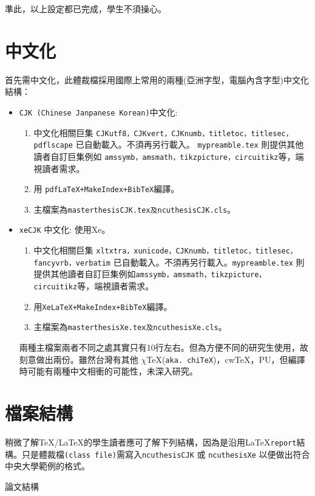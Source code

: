準此，以上設定都已完成，學生不須操心。
\section{中文化}
首先需中文化，此體裁檔採用國際上常用的兩種(亞洲字型，電腦內含字型)中文化結構：
\begin{itemize}
\item {\tt CJK (Chinese Janpanese Korean)}中文化: 
\begin{enumerate}
\item 中文化相關巨集 {\tt CJKutf8，CJKvert，CJKnumb，titletoc，titlesec，pdflscape} 已自動載入。不須再另行載入。
{\tt mypreamble.tex} 則提供其他讀者自訂巨集例如 {\tt amssymb，amsmath，tikzpicture，circuitikz}等，端視讀者需求。
\item 用 {\tt pdfLaTeX+MakeIndex+BibTeX}編譯。
\item 主檔案為{\tt masterthesis{\color{red}CJK}.tex及ncuthesis{\color{red}CJK}.cls}。
\end{enumerate}
\item {\tt xeCJK} 中文化: 使用Xe。
\begin{enumerate}
\item 中文化相關巨集 {\tt xltxtra，xunicode，CJKnumb，titletoc，titlesec，fancyvrb，verbatim} 已自動載入。不須再另行載入。{\tt mypreamble.tex} 則提供其他讀者自訂巨集例如{\tt amssymb，amsmath，tikzpicture， circuitikz}等，端視讀者需求。
\item 用{\tt XeLaTeX+MakeIndex+BibTeX}編譯。
\item 主檔案為{\tt masterthesis{\color{red}Xe}.tex及ncuthesis{\color{red}Xe}.cls}。
\end{enumerate}
兩種主檔案兩者不同之處其實只有10行左右。但為方便不同的研究生使用，故刻意做出兩份。雖然台灣有其他 $\chi$\TeX({\tt aka. chi\TeX})，cw\TeX，PU，但編譯時可能有兩種中文相衝的可能性，未深入研究。
\end{itemize}
\section{檔案結構}
稍微了解\TeX{}/\LaTeX{}的學生讀者應可了解下列結構，因為是沿用\LaTeX{}{\tt report}結構。只是體裁檔{\tt (class file)}需寫入{\tt ncuthesisCJK} 或 {\tt ncuthesisXe} 以便做出符合中央大學範例的格式。%
\begin{table}[hbt!]
\caption{論文結構}
\label{bookstruc} 
\end{table}

